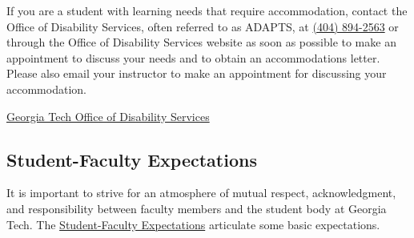 \documentclass[11pt]{article}
\begin{document}
If you are a student with learning needs that require accommodation, contact the Office of Disability Services, often referred to as ADAPTS, at \href{tel:4048942563}{(404) 894-2563} or through the Office of Disability Services website as soon as possible to make an appointment to discuss your needs and to obtain an accommodations letter. Please also email your instructor to make an appointment for discussing your accommodation.

\href{http://disabilityservices.gatech.edu/}{Georgia Tech Office of Disability Services}

\subsection*{Student-Faculty Expectations}

It is important to strive for an atmosphere of mutual respect, acknowledgment, and responsibility between faculty members and the student body at Georgia Tech. The \href{http://www.catalog.gatech.edu/rules/22/}{Student-Faculty Expectations} articulate some basic expectations.
\end{document}
